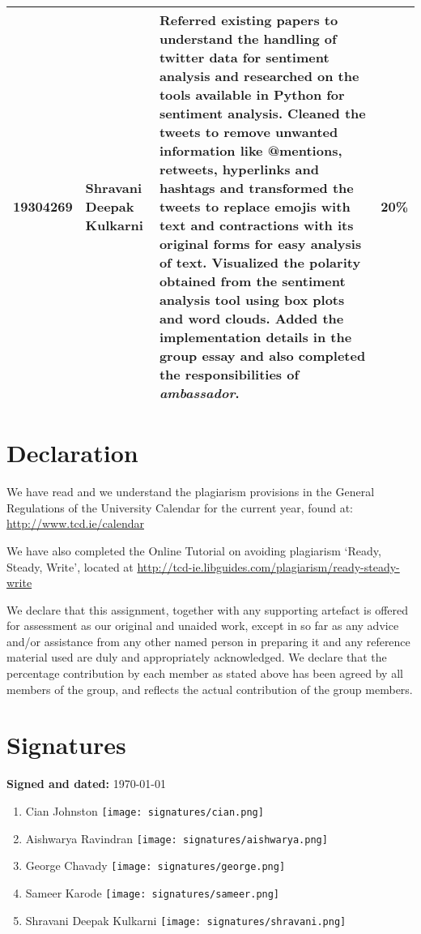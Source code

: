 \documentclass[a4paper,10pt]{article}
\begin{document}
\begin{tabular}{ | p{2cm} | p{2cm} | p{10cm} | l | }
19304269 & Shravani Deepak Kulkarni & Referred existing papers to understand the handling of twitter data for sentiment analysis and researched on the tools available in Python for sentiment analysis. Cleaned the tweets to remove unwanted information like @mentions, retweets, hyperlinks and hashtags and transformed the tweets to replace emojis with text and contractions with its original forms for easy analysis of text. Visualized the polarity obtained from the sentiment analysis tool using box plots and word clouds. Added the implementation details in the group essay and also completed the responsibilities of \textit{ambassador}. & 20\% \\ \hline
\end{tabular}

\section{Declaration}
We have read and we understand the plagiarism provisions in the General Regulations of the University Calendar for the current year, found at: \url{http://www.tcd.ie/calendar}

We have also completed the Online Tutorial on avoiding plagiarism ‘Ready, Steady, Write’, located at \url{http://tcd-ie.libguides.com/plagiarism/ready-steady-write}

We  declare  that  this  assignment, together with any supporting artefact is offered for assessment as our original and unaided work, except in so far as any advice and/or assistance from any other named person in preparing it and any reference material used are duly and appropriately acknowledged. We declare that the percentage contribution by each member as stated above has been agreed by all members of the group, and reflects the actual contribution of the group members.

\section{Signatures}
\textbf{Signed and dated:} \today

\begin{enumerate}
    \item{
        Cian Johnston \texttt{[image: signatures/cian.png]}
    }
    \item{
        Aishwarya Ravindran \texttt{[image: signatures/aishwarya.png]}
    }
    \item{
        George Chavady \texttt{[image: signatures/george.png]}
    }
    \item{
        Sameer Karode \texttt{[image: signatures/sameer.png]}
    }
    \item{
        Shravani Deepak Kulkarni \texttt{[image: signatures/shravani.png]}
    }

\end{enumerate}
\end{document}
